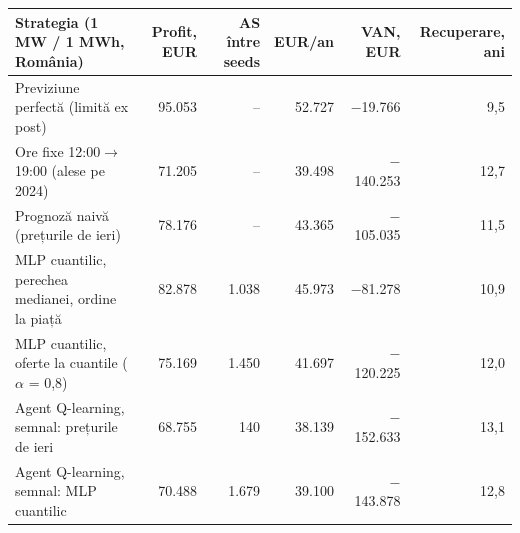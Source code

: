 \begin{tabular}{lrrrrr}
\toprule
Strategia (1 MW / 1 MWh, România) & Profit, EUR & AS între seeds & EUR/an & VAN, EUR & Recuperare, ani \\
\midrule
Previziune perfectă (limită ex post) & 95.053 & -- & 52.727 & $-$19.766 & 9,5 \\
Ore fixe 12:00$\rightarrow$19:00 (alese pe 2024) & 71.205 & -- & 39.498 & $-$140.253 & 12,7 \\
Prognoză naivă (prețurile de ieri) & 78.176 & -- & 43.365 & $-$105.035 & 11,5 \\
MLP cuantilic, perechea medianei, ordine la piață & 82.878 & 1.038 & 45.973 & $-$81.278 & 10,9 \\
MLP cuantilic, oferte la cuantile ($\alpha$ = 0,8) & 75.169 & 1.450 & 41.697 & $-$120.225 & 12,0 \\
Agent Q-learning, semnal: prețurile de ieri & 68.755 & 140 & 38.139 & $-$152.633 & 13,1 \\
Agent Q-learning, semnal: MLP cuantilic & 70.488 & 1.679 & 39.100 & $-$143.878 & 12,8 \\
\bottomrule
\end{tabular}
